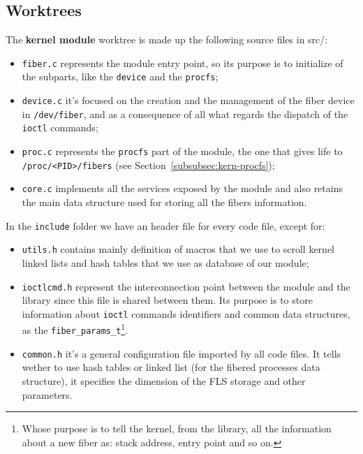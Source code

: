 \documentclass[a4paper,10pt]{article}
\begin{document}
\subsection{Worktrees}
  The \textbf{kernel module} worktree is made up the following source files in src/:
  \begin{itemize}
    \item \lstinline{fiber.c} represents the module entry point, so its purpose is to initialize of the subparts, like the \lstinline{device} and the \lstinline{procfs};
    \item \lstinline{device.c} it's focused on the creation and the management of the fiber device in \lstinline{/dev/fiber}, and as a consequence of all what regards the dispatch of the \lstinline{ioctl} commands;
    \item \lstinline{proc.c} represents the \lstinline{procfs} part of the module, the one that gives life to \lstinline{/proc/<PID>/fibers} (see Section~\ref{subsubsec:kern-procfs});
    \item \lstinline{core.c} implements all the services exposed by the module and also retains the main data structure used for storing all the fibers information.
  \end{itemize}
  In the \lstinline{include} folder we have an header file for every code file, except for:
  \begin{itemize}
    \item \lstinline{utils.h} contains mainly definition of macros that we use to scroll kernel linked lists and hash tables that we use as database of our module;
    \item \lstinline{ioctlcmd.h} represent the interconnection point between the module and the library since this file is shared between them. Its purpose is to store information about \lstinline{ioctl} commands identifiers and common data structures, as the \lstinline{fiber_params_t}\footnote{Whose purpose is to tell the kernel, from the library, all the information about a new fiber as: stack address, entry point and so on.}.
    \item \lstinline{common.h} it's a general configuration file imported by all code files. It tells wether to use hash tables or linked list (for the fibered processes data structure), it specifies the dimension of the FLS storage and other parameters.
  \end{itemize}
\end{document}
